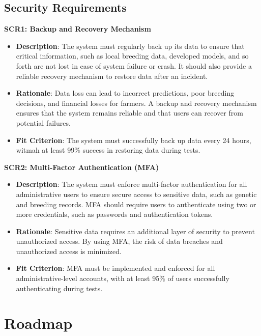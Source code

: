 \documentclass{article}
\begin{document}
\subsection{Security Requirements}

\textbf{SCR1: Backup and Recovery Mechanism} 
\begin{itemize}
    \item \textbf{Description}: The system must regularly back up its data to 
    ensure that critical information, such as local breeding data, developed models, and so forth are not lost in case of system failure or crash. It should also 
    provide a reliable recovery mechanism to restore data after an incident.
    \item \textbf{Rationale}: Data loss can lead to incorrect predictions, poor 
    breeding decisions, and financial losses for farmers. A backup and recovery 
    mechanism ensures that the system remains reliable and that users can 
    recover from potential failures.
    \item \textbf{Fit Criterion}: The system must successfully back up data 
    every 24 hours, witmah at least 99\% success in restoring data during tests.
\end{itemize}
\vspace{10pt}

\textbf{SCR2: Multi-Factor Authentication (MFA)} 
\begin{itemize}
    \item \textbf{Description}: The system must enforce multi-factor 
    authentication for all administrative users to ensure secure access to 
    sensitive data, such as genetic and breeding records. MFA should require 
    users to authenticate using two or more credentials, such as passwords and 
    authentication tokens.
    \item \textbf{Rationale}: Sensitive data requires an additional layer of 
    security to prevent unauthorized access. By using MFA, the risk of data 
    breaches and unauthorized access is minimized.
    \item \textbf{Fit Criterion}: MFA must be implemented and enforced for all 
    administrative-level accounts, with at least 95\% of users successfully 
    authenticating during tests.
\end{itemize}

\section{Roadmap}
\end{document}
